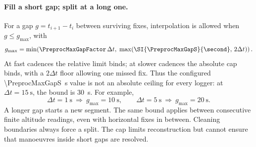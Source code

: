 \paragraph{Fill a short gap; split at a long one.}
For a gap $g=t_{i+1}-t_i$ between surviving fixes, interpolation is allowed when
$g\le g_{\max}$, with
\begin{equation}
 g_{\max}=\min\!\left(
   \PreprocMaxGapFactor\,\Delta t,\;
   \max\!\left(\SI{\PreprocMaxGapS}{\second},\,2\Delta t\right)\right).
 \label{eq:uniform-gap-bound}
\end{equation}
At fast cadences the relative limit binds; at slower cadences the absolute cap
binds, with a $2\Delta t$ floor allowing one missed fix. Thus the configured
\SI{\PreprocMaxGapS}{\second} value is not an absolute ceiling for every logger:
at $\Delta t=\SI{15}{\second}$, the bound is \SI{30}{\second}. For example,
\[
 \Delta t=\SI{1}{\second}\ \Rightarrow\ g_{\max}=\SI{10}{\second},
 \qquad
 \Delta t=\SI{5}{\second}\ \Rightarrow\ g_{\max}=\SI{20}{\second}.
\]
A longer gap starts a new segment. The same bound applies between consecutive
finite altitude readings, even with horizontal fixes in between. Cleaning
boundaries always force a split. The cap limits reconstruction but cannot ensure
that manoeuvres inside short gaps are resolved.

